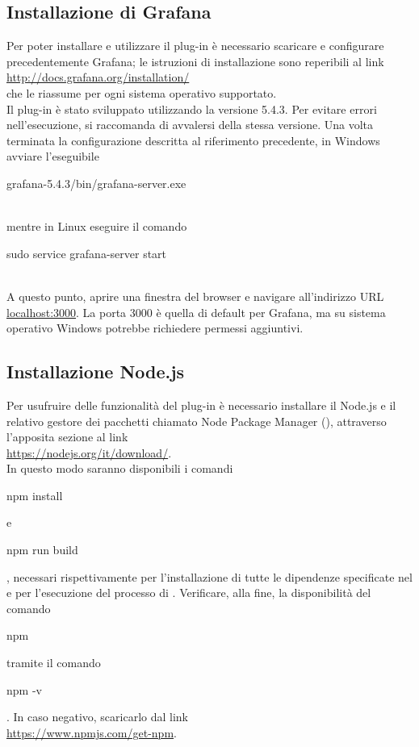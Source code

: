 \subsection{Installazione di Grafana}
Per poter installare e utilizzare il plug-in è necessario scaricare e configurare precedentemente Grafana; le istruzioni di installazione sono reperibili al link\\[0.2cm]
\hspace*{10mm}\url{http://docs.grafana.org/installation/} \\[0.2cm]
che le riassume per ogni sistema operativo supportato.\\
Il plug-in è stato sviluppato utilizzando la versione 5.4.3. Per evitare errori nell'esecuzione, si raccomanda di avvalersi della stessa versione.
Una volta terminata la configurazione descritta al riferimento precedente, in Windows avviare l'eseguibile\\[0.2cm]
\hspace*{10mm}\begin{ttfamily}grafana-5.4.3/bin/grafana-server.exe\end{ttfamily}\\[0.2cm] mentre in Linux eseguire il comando\\[0.2cm]
\hspace*{10mm}\begin{ttfamily}sudo service grafana-server start\end{ttfamily}\\[0.2cm]
A questo punto, aprire una finestra del browser e navigare all'indirizzo URL \url{localhost:3000}. La porta 3000 è quella di default per Grafana, ma su sistema operativo Windows potrebbe richiedere permessi aggiuntivi.
\subsection{Installazione Node.js}
Per usufruire delle funzionalità del plug-in è necessario installare il  Node.js e il relativo gestore dei pacchetti chiamato Node Package Manager (), attraverso l'apposita sezione al link\\[0.2cm]
\hspace*{10mm}\url{https://nodejs.org/it/download/}.\\[0.2cm] In questo modo saranno disponibili i comandi \begin{ttfamily}npm install\end{ttfamily} e \begin{ttfamily}npm run build\end{ttfamily}, necessari rispettivamente per l'installazione di tutte le dipendenze specificate nel  e per l'esecuzione del processo di .
Verificare, alla fine, la disponibilità del comando \begin{ttfamily}npm\end{ttfamily} tramite il comando \begin{ttfamily}npm -v\end{ttfamily}. In caso negativo, scaricarlo dal link \\[0.2cm]
\hspace*{10mm}\url{https://www.npmjs.com/get-npm}.

